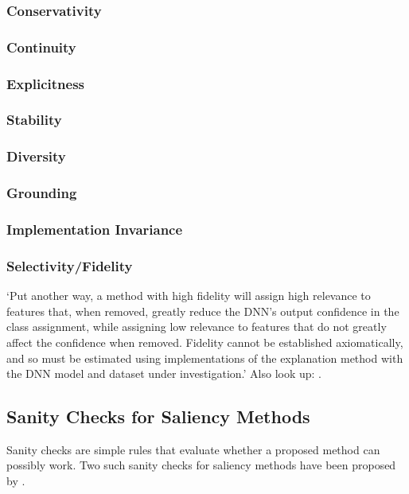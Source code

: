 \subsubsection{Conservativity}
\blindtext[1]
\subsubsection{Continuity}
\blindtext[1]
\subsubsection{Explicitness}
\citeauthor{AlvarezMelis.2018}
\blindtext[1]
\subsubsection{Stability}
\citeauthor{AlvarezMelis.2018}
\blindtext[1]
\subsubsection{Diversity}
\citeauthor{AlvarezMelis.2018}
\blindtext[1]
\subsubsection{Grounding}
\citeauthor{AlvarezMelis.2018}
\blindtext[1]
\subsubsection{Implementation Invariance}
\blindtext[1]
\subsubsection{Selectivity/Fidelity}
`Put another way, a method with high fidelity will assign high relevance to features that, when removed, greatly reduce the DNN’s output confidence in the class assignment, while assigning low relevance to features that do not greatly affect the confidence when removed. Fidelity cannot be established axiomatically, and so must be estimated using implementations of the explanation method with the DNN model and dataset under investigation.'\cite{Tomsett.2019} Also look up: \citeauthor{Bach.2015, AlvarezMelis.2018}.

\subsection{Sanity Checks for Saliency Methods}
Sanity checks are simple rules that evaluate whether a proposed method can possibly work. Two such sanity checks for saliency methods have been proposed by .

